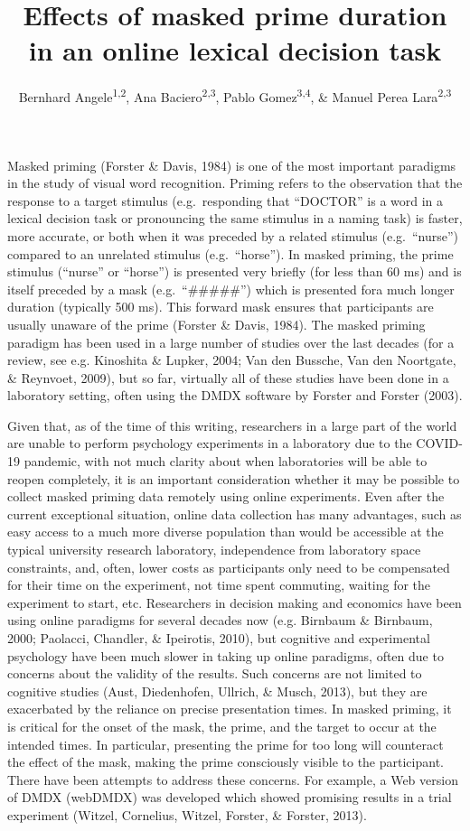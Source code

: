 \documentclass[
  english,
  man]{apa6}
\author{Bernhard Angele\textsuperscript{1,2}, Ana Baciero\textsuperscript{2,3}, Pablo Gomez\textsuperscript{3,4}, \& Manuel Perea Lara\textsuperscript{2,3}}
\affiliation{
\vspace{0.5cm}
\textsuperscript{1} Bournemouth University\\\textsuperscript{2} Universitat de Valencia, Valencia, Spain\\\textsuperscript{3} Nebrija University, Madrid, Spain\\\textsuperscript{4} California State University San Bernardino, Palm Desert Campus}
\title{Effects of masked prime duration in an online lexical decision task}
\date{}
\begin{document}
\maketitle

Masked priming (Forster \& Davis, 1984) is one of the most important paradigms in the study of visual word recognition. Priming refers to the observation that the response to a target stimulus (e.g.~responding that ``DOCTOR'' is a word in a lexical decision task or pronouncing the same stimulus in a naming task) is faster, more accurate, or both when it was preceded by a related stimulus (e.g.~``nurse'') compared to an unrelated stimulus (e.g.~``horse''). In masked priming, the prime stimulus (``nurse'' or ``horse'') is presented very briefly (for less than 60 ms) and is itself preceded by a mask (e.g.~``\#\#\#\#\#'') which is presented fora much longer duration (typically 500 ms). This forward mask ensures that participants are usually unaware of the prime (Forster \& Davis, 1984). The masked priming paradigm has been used in a large number of studies over the last decades (for a review, see e.g. Kinoshita \& Lupker, 2004; Van den Bussche, Van den Noortgate, \& Reynvoet, 2009), but so far, virtually all of these studies have been done in a laboratory setting, often using the DMDX software by Forster and Forster (2003).

Given that, as of the time of this writing, researchers in a large part of the world are unable to perform psychology experiments in a laboratory due to the COVID-19 pandemic, with not much clarity about when laboratories will be able to reopen completely, it is an important consideration whether it may be possible to collect masked priming data remotely using online experiments. Even after the current exceptional situation, online data collection has many advantages, such as easy access to a much more diverse population than would be accessible at the typical university research laboratory, independence from laboratory space constraints, and, often, lower costs as participants only need to be compensated for their time on the experiment, not time spent commuting, waiting for the experiment to start, etc. Researchers in decision making and economics have been using online paradigms for several decades now (e.g. Birnbaum \& Birnbaum, 2000; Paolacci, Chandler, \& Ipeirotis, 2010), but cognitive and experimental psychology have been much slower in taking up online paradigms, often due to concerns about the validity of the results. Such concerns are not limited to cognitive studies (Aust, Diedenhofen, Ullrich, \& Musch, 2013), but they are exacerbated by the reliance on precise presentation times. In masked priming, it is critical for the onset of the mask, the prime, and the target to occur at the intended times. In particular, presenting the prime for too long will counteract the effect of the mask, making the prime consciously visible to the participant. There have been attempts to address these concerns. For example, a Web version of DMDX (webDMDX) was developed which showed promising results in a trial experiment (Witzel, Cornelius, Witzel, Forster, \& Forster, 2013).
\end{document}
